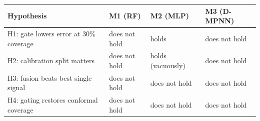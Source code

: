 \begin{tabular}{@{}llll@{}}
\toprule
Hypothesis & M1 (RF) & M2 (MLP) & M3 (D-MPNN) \\
\midrule
H1: gate lowers error at 30\% coverage & does not hold & holds & does not hold \\
H2: calibration split matters & does not hold & holds (vacuously) & does not hold \\
H3: fusion beats best single signal & does not hold & does not hold & does not hold \\
H4: gating restores conformal coverage & does not hold & does not hold & does not hold \\
\bottomrule
\end{tabular}